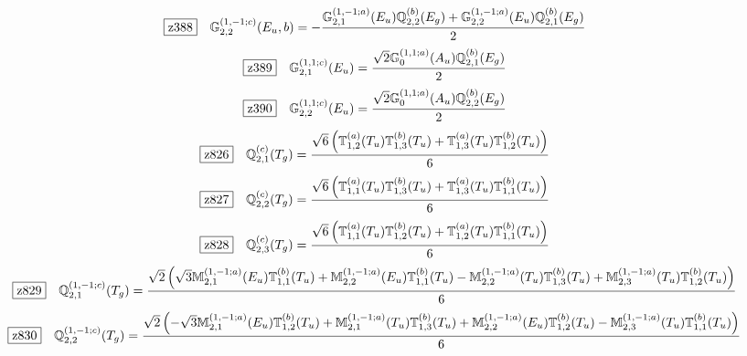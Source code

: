 \documentclass[fleqn,10pt,landscape]{jsarticle}
\begin{document}
\begin{dmath*}
\hspace*{3mm}\fbox{z388}\quad \mathbb{G}_{2,2}^{(1,-1;c)}(E_{u},b)=- \frac{\mathbb{G}_{2,1}^{(1,-1;a)}(E_{u}) \mathbb{Q}_{2,2}^{(b)}(E_{g}) + \mathbb{G}_{2,2}^{(1,-1;a)}(E_{u}) \mathbb{Q}_{2,1}^{(b)}(E_{g})}{2}
\end{dmath*}
\begin{dmath*}
\hspace*{3mm}\fbox{z389}\quad \mathbb{G}_{2,1}^{(1,1;c)}(E_{u})=\frac{\sqrt{2} \mathbb{G}_{0}^{(1,1;a)}(A_{u}) \mathbb{Q}_{2,1}^{(b)}(E_{g})}{2}
\end{dmath*}
\begin{dmath*}
\hspace*{3mm}\fbox{z390}\quad \mathbb{G}_{2,2}^{(1,1;c)}(E_{u})=\frac{\sqrt{2} \mathbb{G}_{0}^{(1,1;a)}(A_{u}) \mathbb{Q}_{2,2}^{(b)}(E_{g})}{2}
\end{dmath*}
\begin{dmath*}
\hspace*{3mm}\fbox{z826}\quad \mathbb{Q}_{2,1}^{(c)}(T_{g})=\frac{\sqrt{6} \left(\mathbb{T}_{1,2}^{(a)}(T_{u}) \mathbb{T}_{1,3}^{(b)}(T_{u}) + \mathbb{T}_{1,3}^{(a)}(T_{u}) \mathbb{T}_{1,2}^{(b)}(T_{u})\right)}{6}
\end{dmath*}
\begin{dmath*}
\hspace*{3mm}\fbox{z827}\quad \mathbb{Q}_{2,2}^{(c)}(T_{g})=\frac{\sqrt{6} \left(\mathbb{T}_{1,1}^{(a)}(T_{u}) \mathbb{T}_{1,3}^{(b)}(T_{u}) + \mathbb{T}_{1,3}^{(a)}(T_{u}) \mathbb{T}_{1,1}^{(b)}(T_{u})\right)}{6}
\end{dmath*}
\begin{dmath*}
\hspace*{3mm}\fbox{z828}\quad \mathbb{Q}_{2,3}^{(c)}(T_{g})=\frac{\sqrt{6} \left(\mathbb{T}_{1,1}^{(a)}(T_{u}) \mathbb{T}_{1,2}^{(b)}(T_{u}) + \mathbb{T}_{1,2}^{(a)}(T_{u}) \mathbb{T}_{1,1}^{(b)}(T_{u})\right)}{6}
\end{dmath*}
\begin{dmath*}
\hspace*{3mm}\fbox{z829}\quad \mathbb{Q}_{2,1}^{(1,-1;c)}(T_{g})=\frac{\sqrt{2} \left(\sqrt{3} \mathbb{M}_{2,1}^{(1,-1;a)}(E_{u}) \mathbb{T}_{1,1}^{(b)}(T_{u}) + \mathbb{M}_{2,2}^{(1,-1;a)}(E_{u}) \mathbb{T}_{1,1}^{(b)}(T_{u}) - \mathbb{M}_{2,2}^{(1,-1;a)}(T_{u}) \mathbb{T}_{1,3}^{(b)}(T_{u}) + \mathbb{M}_{2,3}^{(1,-1;a)}(T_{u}) \mathbb{T}_{1,2}^{(b)}(T_{u})\right)}{6}
\end{dmath*}
\begin{dmath*}
\hspace*{3mm}\fbox{z830}\quad \mathbb{Q}_{2,2}^{(1,-1;c)}(T_{g})=\frac{\sqrt{2} \left(- \sqrt{3} \mathbb{M}_{2,1}^{(1,-1;a)}(E_{u}) \mathbb{T}_{1,2}^{(b)}(T_{u}) + \mathbb{M}_{2,1}^{(1,-1;a)}(T_{u}) \mathbb{T}_{1,3}^{(b)}(T_{u}) + \mathbb{M}_{2,2}^{(1,-1;a)}(E_{u}) \mathbb{T}_{1,2}^{(b)}(T_{u}) - \mathbb{M}_{2,3}^{(1,-1;a)}(T_{u}) \mathbb{T}_{1,1}^{(b)}(T_{u})\right)}{6}
\end{dmath*}
\end{document}
